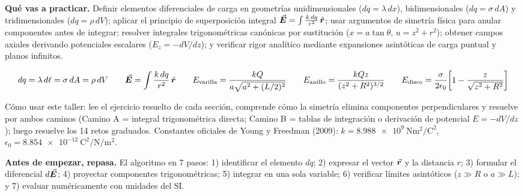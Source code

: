 \documentclass[11pt]{article}
\begin{document}

\textbf{Qué vas a practicar.} Definir elementos diferenciales de carga en geometrías unidimensionales ($dq=\lambda\,dx$), bidimensionales ($dq=\sigma\,dA$) y tridimensionales ($dq=\rho\,dV$); aplicar el principio de superposición integral $\vec{\bm{E}}=\int \frac{k\,dq}{r^2}\,\hat{\bm{r}}$; usar argumentos de simetría física para anular componentes antes de integrar; resolver integrales trigonométricas canónicas por sustitución ($x=a\tan\theta$, $u=z^2+r^2$); obtener campos axiales derivando potenciales escalares ($E_z=-dV/dz$); y verificar rigor analítico mediante expansiones asintóticas de carga puntual y planos infinitos.

\begin{eFormula}
\vspace{-6pt}\[ dq = \lambda\,d\ell = \sigma\,dA = \rho\,dV\qquad \vec{\bm{E}} = \int \frac{k\,dq}{r^2}\,\hat{\bm{r}}\qquad E_{\text{varilla}} = \frac{kQ}{a\sqrt{a^2+(L/2)^2}}\qquad E_{\text{anillo}} = \frac{kQz}{(z^2+R^2)^{3/2}}\qquad E_{\text{disco}} = \frac{\sigma}{2\epsilon_0}\!\left[1-\frac{z}{\sqrt{z^2+R^2}}\right] \]\vspace{-10pt}
\end{eFormula}

{\small\color{e10muted}Cómo usar este taller: lee el ejercicio resuelto de cada sección, comprende cómo la simetría elimina componentes perpendiculares y resuelve por ambos caminos (Camino A = integral trigonométrica directa; Camino B = tablas de integración o derivación de potencial $E=-dV/dz$); luego resuelve los 14 retos graduados. Constantes oficiales de Young y Freedman (2009): $k=\SI{8,988e9}{\newton\metre\squared\per\coulomb\squared}$, $\epsilon_0=\SI{8,854e-12}{\coulomb\squared\per\newton\per\metre\squared}$.}

\begin{eClave}{\sffamily\small\bfseries\color{e10primary}Antes de empezar, repasa.} El algoritmo en 7 pasos: 1) identificar el elemento $dq$; 2) expresar el vector $\vec{\bm{r}}$ y la distancia $r$; 3) formular el diferencial $d\vec{\bm{E}}$; 4) proyectar componentes trigonométricas; 5) integrar en una sola variable; 6) verificar límites asintóticos ($z\gg R$ o $a\gg L$); y 7) evaluar numéricamente con unidades del SI.\end{eClave}

\end{document}
